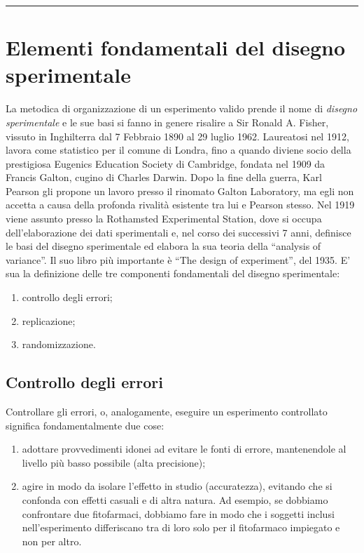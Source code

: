 \documentclass[
  12pt,
]{book}
\providecommand{\tightlist}{%
  \setlength{\itemsep}{0pt}\setlength{\parskip}{0pt}}
\begin{document}
\begin{center}\rule{0.5\linewidth}{0.5pt}\end{center}

\hypertarget{elementi-fondamentali-del-disegno-sperimentale}{%
\section{Elementi fondamentali del disegno sperimentale}\label{elementi-fondamentali-del-disegno-sperimentale}}

La metodica di organizzazione di un esperimento valido prende il nome di \emph{disegno sperimentale} e le sue basi si fanno in genere risalire a Sir Ronald A. Fisher, vissuto in Inghilterra dal 7 Febbraio 1890 al 29 luglio 1962. Laureatosi nel 1912, lavora come statistico per il comune di Londra, fino a quando diviene socio della prestigiosa Eugenics Education Society di Cambridge, fondata nel 1909 da Francis Galton, cugino di Charles Darwin. Dopo la fine della guerra, Karl Pearson gli propone un lavoro presso il rinomato Galton Laboratory, ma egli non accetta a causa della profonda rivalità esistente tra lui e Pearson stesso. Nel 1919 viene assunto presso la Rothamsted Experimental Station, dove si occupa dell'elaborazione dei dati sperimentali e, nel corso dei successivi 7 anni, definisce le basi del disegno sperimentale ed elabora la sua teoria della ``analysis of variance''. Il suo libro più importante è ``The design of experiment'', del 1935. E' sua la definizione delle tre componenti fondamentali del disegno sperimentale:

\begin{enumerate}
\def\labelenumi{\arabic{enumi}.}
\tightlist
\item
  controllo degli errori;
\item
  replicazione;
\item
  randomizzazione.
\end{enumerate}

\hypertarget{controllo-degli-errori}{%
\subsection{Controllo degli errori}\label{controllo-degli-errori}}

Controllare gli errori, o, analogamente, eseguire un esperimento controllato significa fondamentalmente due cose:

\begin{enumerate}
\def\labelenumi{\arabic{enumi}.}
\tightlist
\item
  adottare provvedimenti idonei ad evitare le fonti di errore, mantenendole al livello più basso possibile (alta precisione);
\item
  agire in modo da isolare l'effetto in studio (accuratezza), evitando che si confonda con effetti casuali e di altra natura. Ad esempio, se dobbiamo confrontare due fitofarmaci, dobbiamo fare in modo che i soggetti inclusi nell'esperimento differiscano tra di loro solo per il fitofarmaco impiegato e non per altro.
\end{enumerate}
\end{document}
